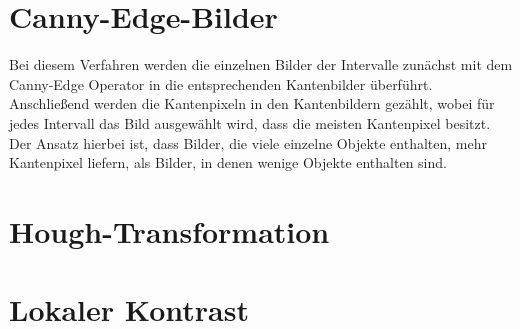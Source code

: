 \section{Canny-Edge-Bilder}
Bei diesem Verfahren werden die einzelnen Bilder der Intervalle zunächst mit dem Canny-Edge Operator in die entsprechenden Kantenbilder überführt. Anschließend werden die Kantenpixeln in den Kantenbildern gezählt, wobei für jedes Intervall das Bild ausgewählt wird, dass die meisten Kantenpixel besitzt.\\

Der Ansatz hierbei ist, dass Bilder, die viele einzelne Objekte enthalten, mehr Kantenpixel liefern, als Bilder, in denen wenige Objekte enthalten sind.

\section{Hough-Transformation}

\section{Lokaler Kontrast}
	


